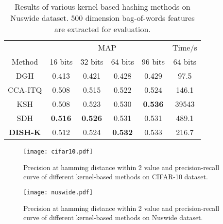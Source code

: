 \documentclass[conference]{IEEEtran}
\begin{document}
\begin{table}[t]
    \centering
    \footnotesize
    \begin{tabular}{c|cccc|c}
        \hline
         & \multicolumn{4}{c|}{MAP} & Time/s \\
        Method & 16 bits & 32 bits & 64 bits & 96 bits & 64 bits \\
        \hline
        DGH & 0.413 & 0.421 & 0.428 & 0.429 & 97.5 \\
        CCA-ITQ & 0.508 & 0.515 & 0.522 & 0.524 & 146.1 \\
        KSH & 0.508 & 0.523 & 0.530 & \textbf{0.536} & 39543 \\
        SDH & \textbf{0.516} & \textbf{0.526} & 0.531 & 0.531 & 489.1 \\
        \textbf{DISH-K} & 0.512 & 0.524 & \textbf{0.532} & 0.533 & 216.7 \\
        \hline
    \end{tabular}
    \caption{Results of various kernel-based hashing methods on Nuswide dataset. 500 dimension bag-of-words features are extracted for evaluation.}
    \label{tab:nuswide}
\end{table}

\begin{figure}[t]
    \centering
    \texttt{[image: cifar10.pdf]}
    \caption{Precision at hamming distance within 2 value and precision-recall curve of different kernel-based methods on CIFAR-10 dataset.}
    \label{fig:cifar10}
\end{figure}

\begin{figure}[t]
    \centering
    \texttt{[image: nuswide.pdf]}
    \caption{Precision at hamming distance within 2 value and precision-recall curve of different kernel-based methods on Nuswide dataset.}
    \label{fig:nuswide}
\end{figure}
\end{document}
